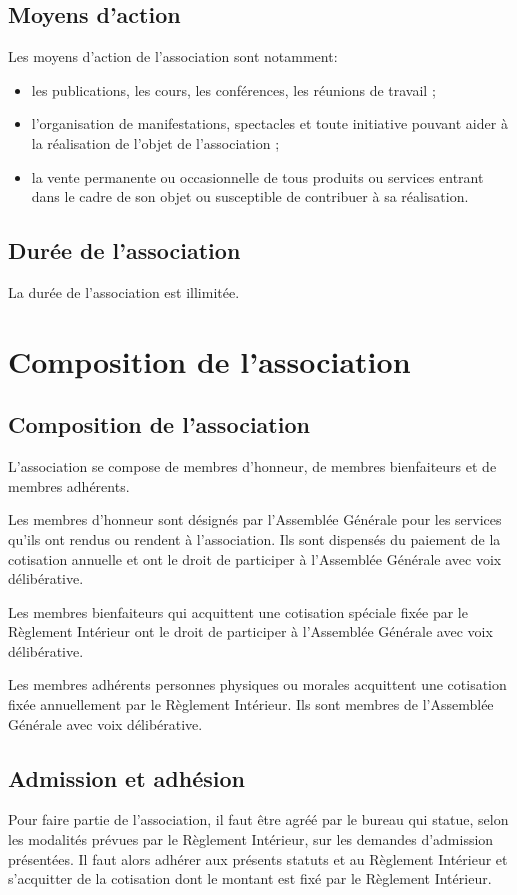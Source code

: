 \documentclass[a4paper,french,10pt]{article}
\begin{document}
\subsection{Moyens d’action}
\label{sec:moyens}

Les moyens d’action de l’association sont notamment:
\begin{itemize}
\item les publications, les cours, les conférences, les réunions de
travail ;
\item l’organisation de manifestations, spectacles et toute initiative
pouvant aider à la réalisation de l’objet de l’association ;
\item la vente permanente ou occasionnelle de tous produits ou
services entrant dans le cadre de son objet ou susceptible de
contribuer à sa réalisation.
\end{itemize}

\subsection{Durée de l’association}
\label{sec:duree}
La durée de l’association est illimitée.

\section{Composition de l’association}

\subsection{Composition de l’association}
\label{sec:composition}
L’association se compose de membres d'honneur, de membres bienfaiteurs
et de membres adhérents.

Les membres d'honneur sont désignés par l'Assemblée Générale pour les
services qu'ils ont rendus ou rendent à l'association. Ils sont
dispensés du paiement de la cotisation annuelle et ont le droit de
participer à l'Assemblée Générale avec voix délibérative.

Les membres bienfaiteurs qui acquittent une cotisation spéciale fixée
par le Règlement Intérieur ont le droit de participer à l'Assemblée
Générale avec voix délibérative.

Les membres adhérents personnes physiques ou morales acquittent une
cotisation fixée annuellement par le Règlement Intérieur. Ils sont
membres de l'Assemblée Générale avec voix délibérative.

\subsection{Admission et adhésion}
\label{sec:admission}
Pour faire partie de l’association, il faut être agréé par le bureau
qui statue, selon les modalités prévues par le Règlement Intérieur, sur les demandes d'admission présentées. Il faut alors adhérer aux présents
statuts et au Règlement Intérieur et s’acquitter de la cotisation dont le montant est fixé par le Règlement Intérieur.
\end{document}
